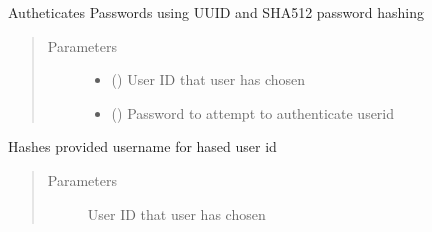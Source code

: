 \documentclass[letterpaper,10pt,english]{sphinxmanual}
\begin{document}
\begin{fulllineitems}
\begin{fulllineitems}
\label{\detokenize{sample:sample.passwordAuthentication.Password.authenticate_password}}
Autheticates Passwords using UUID and SHA512 password hashing
\begin{quote}\begin{description}
\item[{Parameters}] \leavevmode\begin{itemize}
\item {} 
 () \textendash{} User ID that user has chosen

\item {} 
 () \textendash{} Password to attempt to authenticate userid

\end{itemize}

\end{description}\end{quote}

\end{fulllineitems}


\begin{fulllineitems}
\label{\detokenize{sample:sample.passwordAuthentication.Password.hashUsername}}
Hashes provided username for hased user id
\begin{quote}\begin{description}
\item[{Parameters}] \leavevmode
{} \textendash{} User ID that user has chosen

\end{description}\end{quote}

\end{fulllineitems}



\end{fulllineitems}
\end{document}
